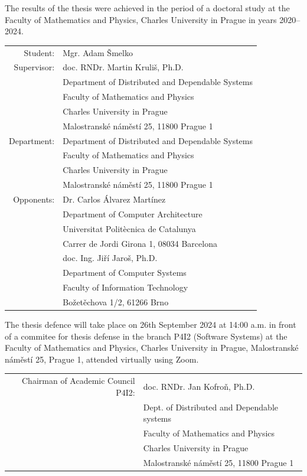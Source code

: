 {
\small
\setlength\parindent{0mm}
\setlength\parskip{2pt}
The results of the thesis were achieved in the period of a doctoral study at
the Faculty of Mathematics and Physics, Charles University in Prague in years
2020--2024.

\begin{center}
\begin{tabular}{rl}
Student:
 & Mgr. Adam Šmelko \\
Supervisor:
 & doc. RNDr. Martin Kruliš, Ph.D. \\
 & Department of Distributed and Dependable Systems \\
 & Faculty of Mathematics and Physics \\
 & Charles University in Prague \\
 & Malostranské náměstí 25, 11800 Prague 1 \\
\addlinespace
Department:
 & Department of Distributed and Dependable Systems \\
 & Faculty of Mathematics and Physics \\
 & Charles University in Prague \\
 & Malostranské náměstí 25, 11800 Prague 1 \\
\addlinespace
Opponents:
 & Dr. Carlos Álvarez Martínez \\
 & Department of Computer Architecture \\
 & Universitat Politècnica de Catalunya  \\
 & Carrer de Jordi Girona 1, 08034 Barcelona \\
 \addlinespace
 & doc. Ing. Jiří Jaroš, Ph.D. \\
 & Department of Computer Systems \\
 & Faculty of Information Technology \\
 & Božetěchova 1/2, 61266 Brno \\
\end{tabular}
\end{center}

The thesis defence will take place on 26th September 2024 at 14:00 a.m. in front
of a commitee for thesis defense in the branch P4I2 (Software Systems) at the
Faculty of Mathematics and Physics, Charles University in Prague, Malostranské
náměstí 25, Prague 1, attended virtually using Zoom.

\begin{center}
\begin{tabular}{rl}
Chairman of Academic Council P4I2: \hspace{-0.5em}
 & doc. RNDr. Jan Kofroň, Ph.D.\\
 & Dept. of Distributed and Dependable systems\\
 & Faculty of Mathematics and Physics\\
 & Charles University in Prague\\
 & Malostranské náměstí 25, 11800 Prague 1\\
\end{tabular}
\end{center}

}
